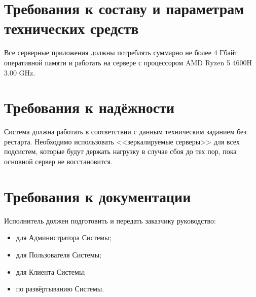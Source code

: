 \section*{Требования к составу и параметрам технических средств}
Все серверные приложения должны потреблять суммарно не более 4 Гбайт оперативной памяти и работать на сервере с процессором AMD Ryzen 5 4600H 3.00 GHz.

\section*{Требования к надёжности}
Система должна работать в соответствии  с  данным  техническим  заданием  без  рестарта.  Необходимо использовать <<зеркалируемые серверы>> для всех подсистем, которые будут держать нагрузку в случае сбоя до тех пор, пока основной сервер не восстановится.

\section*{Требования к документации}
Исполнитель должен подготовить и передать заказчику руководство:
\begin{itemize}
	\item для Администратора Системы;
	
	\item для Пользователя Системы;
	
	\item для Клиента Системы;
	
	\item по развёртыванию Системы.
\end{itemize}